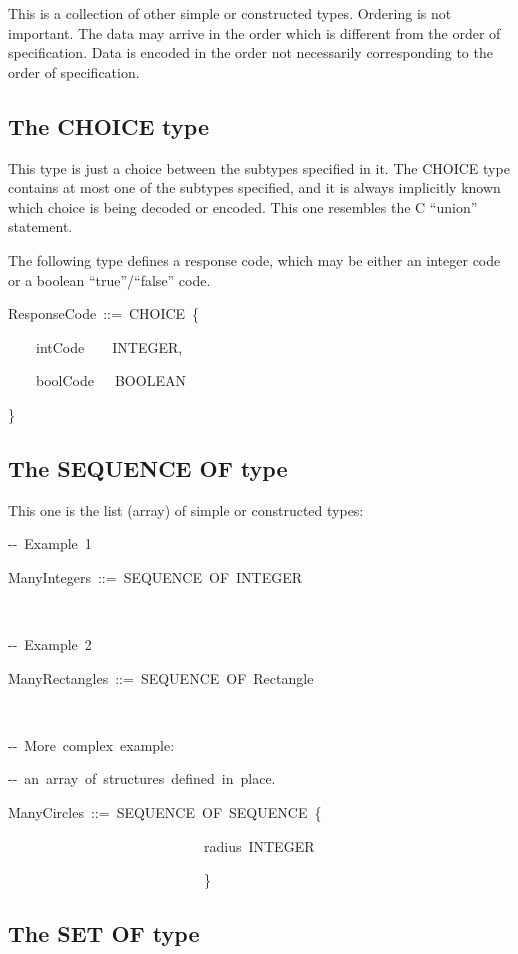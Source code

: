 \documentclass[english,oneside,12pt]{book}
\newenvironment{lyxcode}
{\par\begin{list}{}{
\setlength{\rightmargin}{\leftmargin}
\setlength{\listparindent}{0pt}%
\raggedright
\setlength{\itemsep}{0pt}
\setlength{\parsep}{0pt}
\normalfont\ttfamily}%
 \item[]}
{\end{list}}
\begin{document}
This is a collection of other simple or constructed types. Ordering
is not important. The data may arrive in the order which is different
from the order of specification. Data is encoded in the order not
necessarily corresponding to the order of specification.


\subsection{The CHOICE type}

This type is just a choice between the subtypes specified in it. The
CHOICE type contains at most one of the subtypes specified, and it
is always implicitly known which choice is being decoded or encoded.
This one resembles the C ``union'' statement.

The following type defines a response code, which may be either an
integer code or a boolean ``true''/``false'' code.
\begin{lyxcode}
ResponseCode~::=~CHOICE~\{

~~~~intCode~~~~INTEGER,

~~~~boolCode~~~BOOLEAN

\}


\end{lyxcode}

\subsection{The SEQUENCE OF type}

This one is the list (array) of simple or constructed types:
\begin{lyxcode}
-{}-~Example~1

ManyIntegers~::=~SEQUENCE~OF~INTEGER

~

-{}-~Example~2

ManyRectangles~::=~SEQUENCE~OF~Rectangle

~

-{}-~More~complex~example:

-{}-~an~array~of~structures~defined~in~place.

ManyCircles~::=~SEQUENCE~OF~SEQUENCE~\{

~~~~~~~~~~~~~~~~~~~~~~~~~~~~radius~INTEGER

~~~~~~~~~~~~~~~~~~~~~~~~~~~~\}
\end{lyxcode}

\subsection{The SET OF type}
\end{document}
